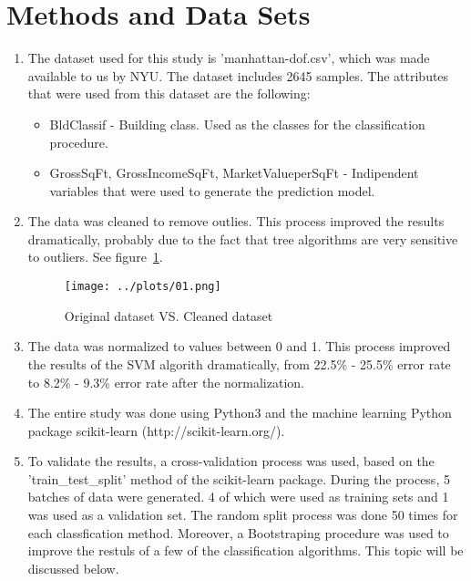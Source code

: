\documentclass[10pt,twocolumn]{article}
\begin{document}
\section{Methods and Data Sets}
\begin{enumerate}

  \item The dataset used for this study is 'manhattan-dof.csv', which was made available to us by NYU. The dataset includes 2645 samples. The attributes that were used from this dataset are the following:
  \begin{itemize}
    \item BldClassif - Building class. Used as the classes for the classification procedure.
    \item GrossSqFt, GrossIncomeSqFt, MarketValueperSqFt - Indipendent variables that were used to generate the prediction model.
  \end{itemize}

  \item The data was cleaned to remove outlies. This process improved the results dramatically, probably due to the fact that tree algorithms are very sensitive to outliers. See figure~\ref{cleaning}.
    \begin{figure}[!b]
      \begin{center}
        \texttt{[image: ../plots/01.png]}
      \end{center}
      \label{cleaning}
      \caption{\small Original dataset VS. Cleaned dataset}
    \end{figure}

  \item The data was normalized to values between 0 and 1. This process improved the results of the SVM algorith dramatically, from 22.5\% - 25.5\% error rate to 8.2\% - 9.3\% error rate after the normalization.

  \item The entire study was done using Python3 and the machine learning Python package scikit-learn (http://scikit-learn.org/).

  \item To validate the results, a cross-validation process was used, based on the 'train\_test\_split' method of the scikit-learn package. During the process, 5 batches of data were generated. 4 of which were used as training sets and 1 was used as a validation set. The random split process was done 50 times for each classfication method. Moreover, a Bootstraping procedure was used to improve the restuls of a few of the classification algorithms. This topic will be discussed below.


\end{enumerate}
\end{document}
